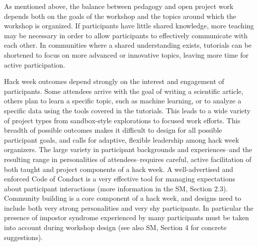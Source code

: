 As mentioned above, the balance between pedagogy and open project work depends both on the goals of the workshop and the topics around which the workshop is organized.
If participants have little shared knowledge, more teaching may be necessary in order to allow participants to effectively communicate with each other.
In communities where a shared understanding exists, tutorials can be shortened to focus on more advanced or innovative topics, leaving more time for active participation.

Hack week outcomes depend strongly on the interest and engagement of participants.
Some attendees arrive with the goal of writing a scientific article, others plan to learn a specific topic, such as machine learning, or to analyze a specific data using the tools covered in the tutorials.
This leads to a wide variety of project types from sandbox-style explorations to focused work efforts.
This breadth of possible outcomes makes it difficult to design for all possible participant goals, and calls for adaptive, flexible leadership among hack week organizers.
The large variety in participant backgrounds and experiences--and the resulting range in personalities of attendees--requires careful, active facilitation of both taught and project components of a hack week. A well-advertised and enforced Code of Conduct is a very effective tool for managing expectations about participant interactions (more information in the SM, Section 2.3). 
Community building is a core component of a hack week, and designs need to include both very strong personalities and very shy participants. In particular the presence of impostor syndrome experienced by many participants must be taken into account during workshop design (see also SM, Section 4 for concrete suggestions).